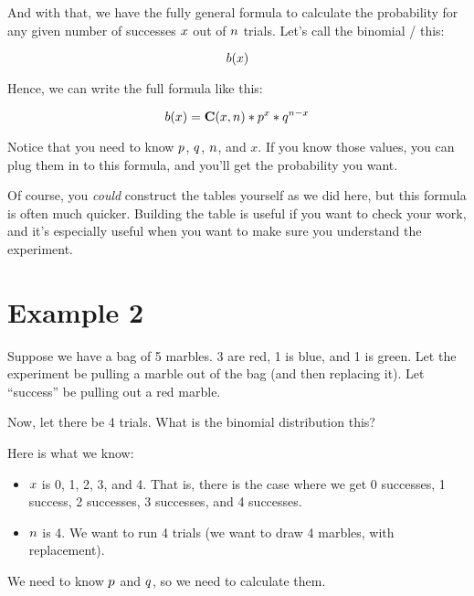 \documentclass[../../../main.tex]{subfiles}
\begin{document}
\noindent
And with that, we have the fully general formula to calculate the probability for any given number of successes $\RandVarVal/$ out of $\numTrials/$ trials. Let's call the binomial \PDFtext/ this: 

\begin{equation*}
    \Binom{\RandVarVal/}
\end{equation*}

Hence, we can write the full formula like this:

\begin{equation*}
    \Binom{\RandVarVal/} = \combs{\RandVarVal/}{n} * p^{\RandVarVal/} * q^{n - \RandVarVal/}
\end{equation*}

Notice that you need to know $\success/$, $\failure/$, $\numTrials/$, and $x$. If you know those values, you can plug them in to this formula, and you'll get the probability you want. 

Of course, you \emph{could} construct the tables yourself as we did here, but this formula is often much quicker. Building the table is useful if you want to check your work, and it's especially useful when you want to make sure you understand the experiment.


\section{Example 2}

Suppose we have a bag of 5 marbles. 3 are red, 1 is blue, and 1 is green. Let the experiment be pulling a marble out of the bag (and then replacing it). Let ``success'' be pulling out a red marble. 

Now, let there be 4 trials. What is the binomial distribution this?

Here is what we know:

\begin{itemize}
  \item $\RandVarVal/$ is 0, 1, 2, 3, and 4. That is, there is the case where we get 0 successes, 1 success, 2 successes, 3 successes, and 4 successes.
  \item $\numTrials/$ is 4. We want to run 4 trials (we want to draw 4 marbles, with replacement).
\end{itemize}

We need to know $\success/$ and $\failure/$, so we need to calculate them.
\end{document}
